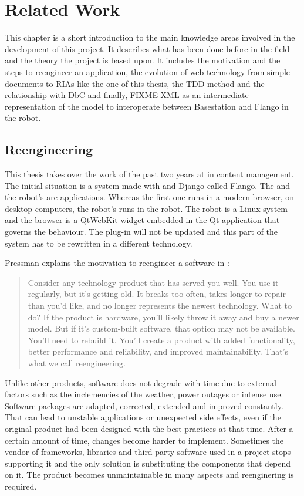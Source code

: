 \chapter{Related Work}
This chapter is a short introduction to the main knowledge areas involved in the development of this project.
It describes what has been done before in the field and the theory the project is based upon.
It includes the motivation and the steps to reengineer an application, the evolution of web technology from simple documents to \acp{RIA} like the one of this thesis, the \ac{TDD} method and the relationship with \ac{DbC} and finally, FIXME \ac{XML} as an intermediate representation of the model to interoperate between Basestation and Flango \cm in the robot.

\section{Reengineering}
\label{sec:reengineering}
This thesis takes over the work of the past two years at \company in content management.
The initial situation is a system made with \flash and Django called Flango.
The \se and the robot's \cm are \flash applications.
Whereas the first one runs in a modern browser, on desktop computers, the robot's \cm runs in the robot.
The robot is a Linux system and the browser is a QtWebKit widget embedded in the Qt application that governs the behaviour.
The \flash plug-in will not be updated and this part of the system has to be rewritten in a different technology.

Pressman explains the motivation to reengineer a software in \cite{Pressman:2007}:
\begin{quote} 
Consider any technology product that has served you well. 
You use it regularly, but it's getting old. 
It breaks too often, takes longer to repair than you'd like, and no longer represents the newest technology.
What to do? If the product is hardware, you'll likely throw it away and buy a newer model.
But if it's custom-built software, that option may not be available. 
You'll need to rebuild it. 
You'll create a product with added functionality, better performance and reliability, and improved maintainability.
That's what we call reengineering. 
\end{quote}

Unlike other products, software does not degrade with time due to external factors such as the inclemencies of the weather, power outages or intense use.
Software packages are adapted, corrected, extended and improved constantly.
That can lead to unstable applications or unexpected side effects, even if the original product had been designed with the best practices at that time.
After a certain amount of time, changes become harder to implement. %
Sometimes the vendor of frameworks, libraries and third-party software used in a project stops supporting it and the only solution is substituting the components that depend on it. 
The product becomes unmaintainable in many aspects and reenginering is required. 

